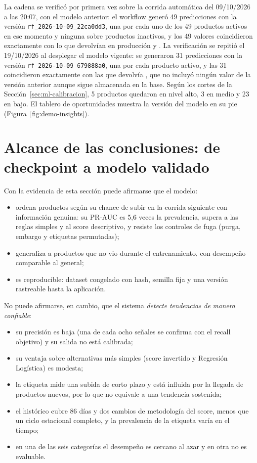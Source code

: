 La cadena se verificó por primera vez sobre la corrida automática del 09/10/2026 a las 20:07, con el modelo anterior: el workflow generó 49 predicciones con la versión \texttt{rf\_2026-10-09\_22ca0dd3}, una por cada uno de los 49 productos activos en ese momento y ninguna sobre productos inactivos, y los 49 valores coincidieron exactamente con lo que devolvían en producción  y . La verificación se repitió el 19/10/2026 al desplegar el modelo vigente: se generaron 31 predicciones con la versión \texttt{rf\_2026-10-09\_679888a0}, una por cada producto activo, y las 31 coincidieron exactamente con las que devolvía , que no incluyó ningún valor de la versión anterior aunque sigue almacenada en la base. Según los cortes de la Sección~\ref{sec:ml-calibracion}, 5 productos quedaron en nivel alto, 3 en medio y 23 en bajo. El tablero de oportunidades muestra la versión del modelo en su pie (Figura~\ref{fig:demo-insights}).

\section{Alcance de las conclusiones: de checkpoint a modelo validado}\label{sec:ml-alcance}

Con la evidencia de esta sección puede afirmarse que el modelo:

\begin{itemize}
	\item ordena productos según su chance de subir en la corrida siguiente con información genuina: su PR-AUC es 5,6 veces la prevalencia, supera a las reglas simples y al score descriptivo, y resiste los controles de fuga (purga, embargo y etiquetas permutadas);
	\item generaliza a productos que no vio durante el entrenamiento, con desempeño comparable al general;
	\item es reproducible: dataset congelado con hash, semilla fija y una versión rastreable hasta la aplicación.
\end{itemize}

No puede afirmarse, en cambio, que el sistema \emph{detecte tendencias de manera confiable}:

\begin{itemize}
	\item su precisión es baja (una de cada ocho señales se confirma con el recall objetivo) y su salida no está calibrada;
	\item su ventaja sobre alternativas más simples (score invertido y Regresión Logística) es modesta;
	\item la etiqueta mide una subida de corto plazo y está influida por la llegada de productos nuevos, por lo que no equivale a una tendencia sostenida;
	\item el histórico cubre 86 días y dos cambios de metodología del score, menos que un ciclo estacional completo, y la prevalencia de la etiqueta varía en el tiempo;
	\item en una de las seis categorías el desempeño es cercano al azar y en otra no es evaluable.
\end{itemize}

